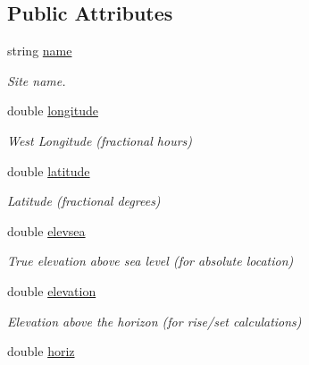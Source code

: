 \subsection*{Public Attributes}
\begin{DoxyCompactItemize}
\item 
\hypertarget{class_observatory_a1fb0f8db9473edad538c3080d667f19f}{string \hyperlink{class_observatory_a1fb0f8db9473edad538c3080d667f19f}{name}}\label{class_observatory_a1fb0f8db9473edad538c3080d667f19f}

\begin{DoxyCompactList}\small\item\em Site name. \end{DoxyCompactList}\item 
\hypertarget{class_observatory_a32b57815b1b98665f41acca3e0051d40}{double \hyperlink{class_observatory_a32b57815b1b98665f41acca3e0051d40}{longitude}}\label{class_observatory_a32b57815b1b98665f41acca3e0051d40}

\begin{DoxyCompactList}\small\item\em West Longitude (fractional hours) \end{DoxyCompactList}\item 
\hypertarget{class_observatory_a9db91c4ef46990995123d125a0720a8e}{double \hyperlink{class_observatory_a9db91c4ef46990995123d125a0720a8e}{latitude}}\label{class_observatory_a9db91c4ef46990995123d125a0720a8e}

\begin{DoxyCompactList}\small\item\em Latitude (fractional degrees) \end{DoxyCompactList}\item 
double \hyperlink{class_observatory_afb7b978a4a804e1f1b7b18355d2bd2be}{elevsea}
\begin{DoxyCompactList}\small\item\em True elevation above sea level (for absolute location) \end{DoxyCompactList}\item 
double \hyperlink{class_observatory_acb7be3c8fdae5a921718d7de3e53def8}{elevation}
\begin{DoxyCompactList}\small\item\em Elevation above the horizon (for rise/set calculations) \end{DoxyCompactList}\item 
\hypertarget{class_observatory_a468d5da03ab3ab792354d1efc9b9c788}{double \hyperlink{class_observatory_a468d5da03ab3ab792354d1efc9b9c788}{horiz}}\label{class_observatory_a468d5da03ab3ab792354d1efc9b9c788}


\end{DoxyCompactItemize}
